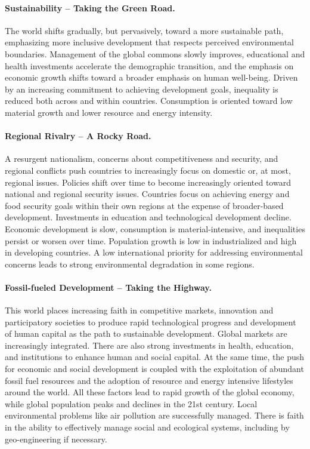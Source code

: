 \begin{kaobox}[frametitle=Shared socioeconomic pathways (SSPs) - Narratives (adopted from \cite{riahi_shared_2017} under CC-BY-4.0), backgroundcolor=Goldenrod!45!white,frametitlebackgroundcolor=Goldenrod!45!white]
\paragraph*{Sustainability – Taking the Green Road.}The world shifts gradually, but pervasively, toward a more sustainable path, emphasizing more inclusive development that respects perceived environmental boundaries. Management of the global commons slowly improves, educational and health investments accelerate the demographic transition, and the emphasis on economic growth shifts toward a broader emphasis on human well-being. Driven by an increasing commitment to achieving development goals, inequality is reduced both across and within countries. Consumption is oriented toward low material growth and lower resource and energy intensity.

\paragraph*{Regional Rivalry – A Rocky Road.}A resurgent nationalism, concerns about competitiveness and security, and regional conflicts push countries to increasingly focus on domestic or, at most, regional issues. Policies shift over time to become increasingly oriented toward national and regional security issues. Countries focus on achieving energy and food security goals within their own regions at the expense of broader-based development. Investments in education and technological development decline. Economic development is slow, consumption is material-intensive, and inequalities persist or worsen over time. Population growth is low in industrialized and high in developing countries. A low international priority for addressing environmental concerns leads to strong environmental degradation in some regions.

\paragraph*{Fossil-fueled Development – Taking the Highway.} This world places increasing faith in competitive markets, innovation and participatory societies to produce rapid technological progress and development of human capital as the path to sustainable development. Global markets are increasingly integrated. There are also strong investments in health, education, and institutions to enhance human and social capital. At the same time, the push for economic and social development is coupled with the exploitation of abundant fossil fuel resources and the adoption of resource and energy intensive lifestyles around the world. All these factors lead to rapid growth of the global economy, while global population peaks and declines in the 21st century. Local environmental problems like air pollution are successfully managed. There is faith in the ability to effectively manage social and ecological systems, including by geo-engineering if necessary.
\end{kaobox}


